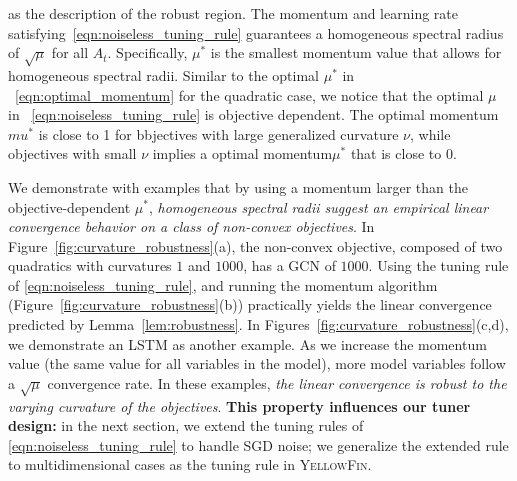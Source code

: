 \documentclass{article}
\newcommand{\mat}[1]{\bm{\mathit{#1}}}
\newcommand{\tuner}{\textsc{YellowFin}\xspace}
\begin{document}
as the description of the robust region. The momentum and learning rate satisfying~\eqref{eqn:noiseless_tuning_rule} guarantees a homogeneous spectral radius of $\sqrt{\mu}$ for all $\mat{A}_t$.
Specifically, $\mu^*$ is the smallest momentum value that allows for homogeneous spectral radii.
Similar to the optimal $\mu^*$ in ~\eqref{eqn:optimal_momentum} for the quadratic case, we notice that the optimal $\mu$ in ~\eqref{eqn:noiseless_tuning_rule} is objective dependent. The optimal momentum $
mu^*$ is close to 1 for bbjectives with large generalized curvature $\nu$, while objectives with small $\nu$ implies a optimal momentum$\mu^*$ that is close to 0.


 
We demonstrate with examples that by using a momentum larger than the objective-dependent $\mu^*$, \emph{homogeneous spectral radii suggest an empirical linear convergence behavior on a class of non-convex objectives}. In Figure~\ref{fig:curvature_robustness}(a), the non-convex objective,
composed of two quadratics with curvatures $1$ and $1000$, has a GCN of $1000$.
Using the tuning rule of \eqref{eqn:noiseless_tuning_rule}, and running the momentum algorithm (Figure~\ref{fig:curvature_robustness}(b)) practically yields the linear convergence predicted by Lemma~\ref{lem:robustness}.
In Figures~\ref{fig:curvature_robustness}(c,d), we demonstrate an LSTM as another example. As we increase the momentum value (the same value for all variables in the model), more model variables follow a $\sqrt{\mu}$ convergence rate.
In these examples, \emph{the linear convergence is robust to the varying curvature of the objectives}. \textbf{This property influences our tuner design:}
{in the next section, we extend the tuning rules of \eqref{eqn:noiseless_tuning_rule} to handle SGD noise; 
we generalize the extended rule to multidimensional cases as the tuning rule in \tuner}.
\end{document}
